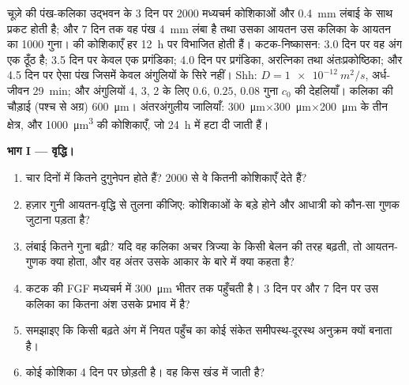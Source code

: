 \begin{problem}
\label{pb:b2:limb-organogenesis:1}
चूज़े की पंख-कलिका उद्भवन के 3 दिन पर \num{2000} मध्यचर्म कोशिकाओं और
\qty{0.4}{mm} लंबाई के साथ प्रकट होती है; और 7 दिन तक वह पंख
\qty{4}{mm} लंबा है तथा उसका आयतन उस कलिका के आयतन का \num{1000} गुना।
 की कोशिकाएँ हर \qty{12}{h} पर विभाजित होती हैं।
कटक-निष्कासन: 3.0 दिन पर वह अंग एक ठूँठ है; 3.5 दिन पर केवल एक
प्रगंडिका; 4.0 दिन पर प्रगंडिका, अरत्निका तथा अंतःप्रकोष्ठिका; और 4.5
दिन पर ऐसा पंख जिसमें केवल अंगुलियों के सिरे नहीं। Shh: $D = \qty{1e-12}{m^2/s}$,
अर्ध-जीवन \qty{29}{min}; और अंगुलियों 4, 3, 2 के लिए $0.6$,
$0.25$, $0.08$ गुना $c_0$ की देहलियाँ। कलिका की चौड़ाई (पश्च
से अग्र) \qty{600}{\micro m}। अंतरअंगुलीय जालियाँ: \qty{300}{\micro m}$\times$\qty{300}{\micro m}$\times$\qty{200}{\micro m} के तीन क्षेत्र, और
\qty{1000}{\micro m^3} की कोशिकाएँ, जो \qty{24}{h} में हटा दी जाती हैं।

\medskip
\noindent\textbf{भाग I --- वृद्धि।}
\begin{enumerate}
  \item चार दिनों में कितने दुगुनेपन होते हैं? \num{2000} से वे कितनी
        कोशिकाएँ देते हैं?
  \item हज़ार गुनी आयतन-वृद्धि से तुलना कीजिए: कोशिकाओं के बड़े होने
        और आधात्री को कौन-सा गुणक जुटाना पड़ता है?
  \item लंबाई कितने गुना बढ़ी? यदि वह कलिका अचर त्रिज्या के किसी बेलन
        की तरह बढ़ती, तो आयतन-गुणक क्या होता, और वह अंतर उसके आकार के
        बारे में क्या कहता है?
  \item कटक की FGF मध्यचर्म में \qty{300}{\micro m} भीतर तक पहुँचती है।
        3 दिन पर और 7 दिन पर उस कलिका का कितना अंश उसके प्रभाव में है?
  \item समझाइए कि किसी बढ़ते अंग में नियत पहुँच का कोई संकेत
        समीपस्थ-दूरस्थ अनुक्रम क्यों बनाता है।
  \item कोई कोशिका 4 दिन पर  छोड़ती है। वह किस खंड में
        जाती है?
\end{enumerate}


\end{problem}

